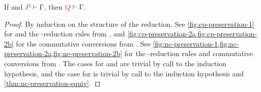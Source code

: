 \begin{theorem}[Preservation]\label{thm:nc-preservation}
  If  and $\seq[{ P }]{ \Gamma }$, then $\seq[{ Q }]{ \Gamma }$.
\end{theorem}
\begin{proof}
  By induction on the structure of the reduction. See
  \cref{fig:cp-preservation-1} for  and the \textbeta-reduction
  rules from \cp, and \cref{fig:cp-preservation-2a,fig:cp-preservation-2b} for the
  commutative conversions from \cp.
  See \cref{fig:nc-preservation-1,fig:nc-preservation-2a,fig:nc-preservation-2b}
  for the \textbeta-reduction rules and commutative conversions from \nodcap.
  The cases for \cpRedGammaCut and \ncRedGammaPool are trivial by call to the
  induction hypothesis, and the case for \cpRedGammaEquiv is trivial by call to
  the induction hypothesis and \cref{thm:nc-preservation-equiv}.
\end{proof}
